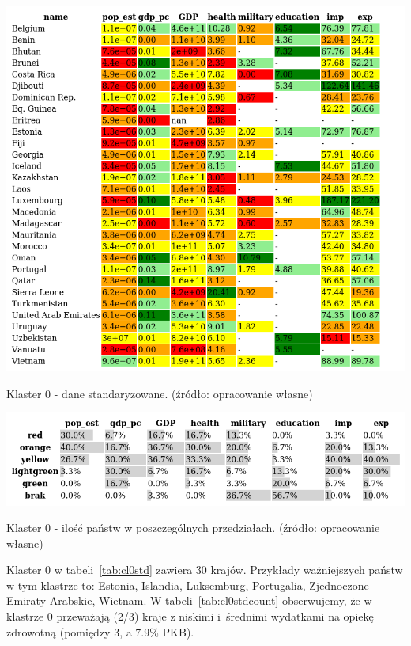 \documentclass[11pt]{report}
\begin{document}
    \begin{table}[!htp]
        \centering
        \includegraphics[width=\linewidth]{tables/CLUST/cluster0stdkmeans.png}
        \caption{Klaster 0 - dane standaryzowane. (źródło: opracowanie własne)}
        \label{tab:cl0std}
    \end{table}

    \begin{table}[!htp]
        \centering
        \includegraphics[width=\linewidth]{tables/CLUST/cluster0stdkmeanscount.png}
        \caption{Klaster 0 - ilość państw w poszczególnych przedziałach. (źródło: opracowanie własne)}
        \label{tab:cl0stdcount}
    \end{table}

    Klaster 0 w tabeli~\ref{tab:cl0std} zawiera 30 krajów.
    Przykłady ważniejszych państw w tym klastrze to: Estonia, Islandia, Luksemburg, Portugalia, Zjednoczone Emiraty Arabskie, Wietnam.
    W tabeli~\ref{tab:cl0stdcount} obserwujemy, że w klastrze 0 przeważają (2/3) kraje z niskimi i~średnimi wydatkami na opiekę zdrowotną (pomiędzy 3, a 7.9\% PKB).
\end{document}
